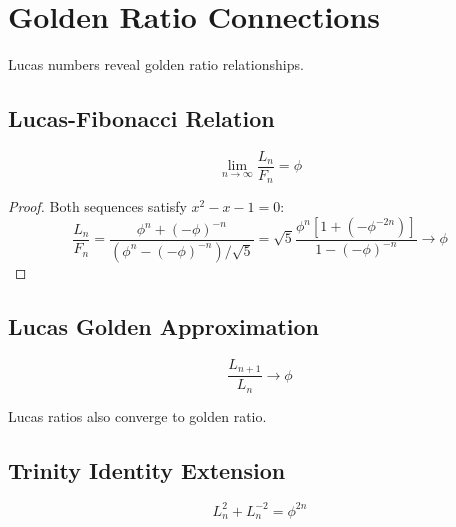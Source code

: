 \section{Golden Ratio Connections}

Lucas numbers reveal golden ratio relationships.

\subsection{Lucas-Fibonacci Relation}

\begin{theorem}
\label{fa_29:thm:lucas-fibo}
\begin{equation}
\lim_{n\to\infty} \frac{L_n}{F_n} = \phi
\end{equation}
\end{theorem}

\begin{proof}
Both sequences satisfy $x^2 - x - 1 = 0$:
\begin{equation}
\frac{L_n}{F_n} = \frac{\phi^n + (-\phi)^{-n}}{(\phi^n - (-\phi)^{-n})/\sqrt{5}} = \sqrt{5}\frac{\phi^n[1 + (-\phi^{-2n})]}{1 - (-\phi)^{-n}} \to \phi
\end{equation}
\end{proof}

\subsection{Lucas Golden Approximation}

\begin{proposition}
\label{fa_29:prop:lucas-golden}
\begin{equation}
\frac{L_{n+1}}{L_n} \to \phi
\end{equation}

Lucas ratios also converge to golden ratio.
\end{proposition}

\subsection{Trinity Identity Extension}

\begin{definition}
\label{fa_29:def:lucas-trinity}
\begin{equation}
L_n^2 + L_n^{-2} = \phi^{2n}
\end{equation}
\end{definition}

